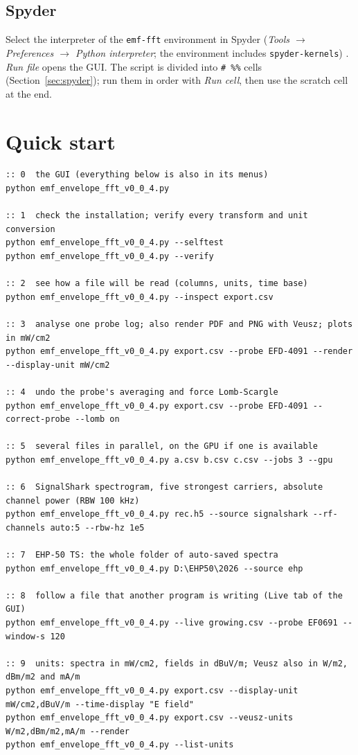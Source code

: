 \documentclass[10pt,letterpaper]{article}
\numberwithin{equation}{section}
\begin{document}
\subsection{Spyder}
Select the interpreter of the \texttt{emf-fft} environment in Spyder
(\emph{Tools $\rightarrow$ Preferences $\rightarrow$ Python interpreter}; the
environment includes \texttt{spyder-kernels}) \cite{B35}. \emph{Run file} opens
the GUI. The script is divided into \verb|# %%| cells
(Section~\ref{sec:spyder}); run them in order with \emph{Run cell}, then use the
scratch cell at the end.

\section{Quick start}\label{sec:quickstart}

\begin{Verbatim}
:: 0  the GUI (everything below is also in its menus)
python emf_envelope_fft_v0_0_4.py

:: 1  check the installation; verify every transform and unit conversion
python emf_envelope_fft_v0_0_4.py --selftest
python emf_envelope_fft_v0_0_4.py --verify

:: 2  see how a file will be read (columns, units, time base)
python emf_envelope_fft_v0_0_4.py --inspect export.csv

:: 3  analyse one probe log; also render PDF and PNG with Veusz; plots in mW/cm2
python emf_envelope_fft_v0_0_4.py export.csv --probe EFD-4091 --render --display-unit mW/cm2

:: 4  undo the probe's averaging and force Lomb-Scargle
python emf_envelope_fft_v0_0_4.py export.csv --probe EFD-4091 --correct-probe --lomb on

:: 5  several files in parallel, on the GPU if one is available
python emf_envelope_fft_v0_0_4.py a.csv b.csv c.csv --jobs 3 --gpu

:: 6  SignalShark spectrogram, five strongest carriers, absolute channel power (RBW 100 kHz)
python emf_envelope_fft_v0_0_4.py rec.h5 --source signalshark --rf-channels auto:5 --rbw-hz 1e5

:: 7  EHP-50 TS: the whole folder of auto-saved spectra
python emf_envelope_fft_v0_0_4.py D:\EHP50\2026 --source ehp

:: 8  follow a file that another program is writing (Live tab of the GUI)
python emf_envelope_fft_v0_0_4.py --live growing.csv --probe EF0691 --window-s 120

:: 9  units: spectra in mW/cm2, fields in dBuV/m; Veusz also in W/m2, dBm/m2 and mA/m
python emf_envelope_fft_v0_0_4.py export.csv --display-unit mW/cm2,dBuV/m --time-display "E field"
python emf_envelope_fft_v0_0_4.py export.csv --veusz-units W/m2,dBm/m2,mA/m --render
python emf_envelope_fft_v0_0_4.py --list-units
\end{Verbatim}
\end{document}
